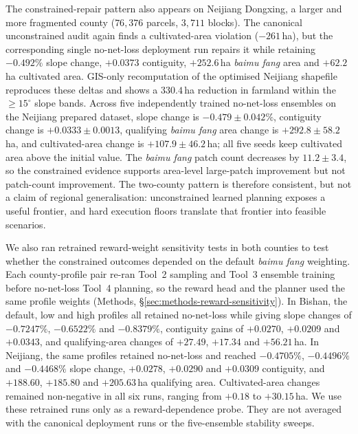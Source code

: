 \documentclass[11pt]{article}
\begin{document}
The constrained-repair pattern also appears on Neijiang Dongxing, a larger and more fragmented county ($76{,}376$ parcels, $3{,}711$ blocks). The canonical unconstrained audit again finds a cultivated-area violation ($-261$\,ha), but the corresponding single no-net-loss deployment run repairs it while retaining $-0.492\%$ slope change, $+0.0373$ contiguity, $+252.6$\,ha \textit{baimu fang} area and $+62.2$\,ha cultivated area. GIS-only recomputation of the optimised Neijiang shapefile reproduces these deltas and shows a $330.4$\,ha reduction in farmland within the $\geq 15^\circ$ slope bands. Across five independently trained no-net-loss ensembles on the Neijiang prepared dataset, slope change is $-0.479 \pm 0.042\%$, contiguity change is $+0.0333 \pm 0.0013$, qualifying \textit{baimu fang} area change is $+292.8 \pm 58.2$\,ha, and cultivated-area change is $+107.9 \pm 46.2$\,ha; all five seeds keep cultivated area above the initial value. The \textit{baimu fang} patch count decreases by $11.2 \pm 3.4$, so the constrained evidence supports area-level large-patch improvement but not patch-count improvement. The two-county pattern is therefore consistent, but not a claim of regional generalisation: unconstrained learned planning exposes a useful frontier, and hard execution floors translate that frontier into feasible scenarios.

We also ran retrained reward-weight sensitivity tests in both counties to test whether the constrained outcomes depended on the default \textit{baimu fang} weighting. Each county-profile pair re-ran Tool~2 sampling and Tool~3 ensemble training before no-net-loss Tool~4 planning, so the reward head and the planner used the same profile weights (Methods, \S\ref{sec:methods-reward-sensitivity}). In Bishan, the default, low and high profiles all retained no-net-loss while giving slope changes of $-0.7247\%$, $-0.6522\%$ and $-0.8379\%$, contiguity gains of $+0.0270$, $+0.0209$ and $+0.0343$, and qualifying-area changes of $+27.49$, $+17.34$ and $+56.21$\,ha. In Neijiang, the same profiles retained no-net-loss and reached $-0.4705\%$, $-0.4496\%$ and $-0.4468\%$ slope change, $+0.0278$, $+0.0290$ and $+0.0309$ contiguity, and $+188.60$, $+185.80$ and $+205.63$\,ha qualifying area. Cultivated-area changes remained non-negative in all six runs, ranging from $+0.18$ to $+30.15$\,ha. We use these retrained runs only as a reward-dependence probe. They are not averaged with the canonical deployment runs or the five-ensemble stability sweeps.
\end{document}
